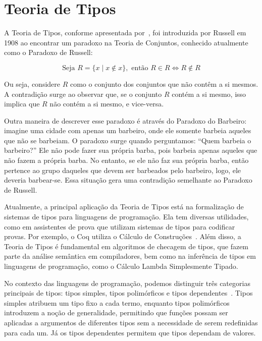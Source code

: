 \section{Teoria de Tipos}\label{sec:type-theory}

A Teoria de Tipos, conforme apresentada por~\cite{COQUAND2022}, foi introduzida por Russell em 1908 ao encontrar um paradoxo na Teoria de Conjuntos, conhecido atualmente como o Paradoxo de Russell:

\begin{equation}\label{eq:russell-paradox}
  \text{Seja } R = \{ x \mid x \notin x \}, \text{ então } R \in R \iff R \notin R
\end{equation}

Ou seja, considere $R$ como o conjunto dos conjuntos que não contêm a si mesmos.
A contradição surge ao observar que, se o conjunto $R$ contém a si mesmo, isso implica que $R$ não contém a si mesmo, e vice-versa.

Outra maneira de descrever esse paradoxo é através do Paradoxo do Barbeiro: imagine uma cidade com apenas um barbeiro, onde ele somente barbeia aqueles que não se barbeiam.
O paradoxo surge quando perguntamos: ``Quem barbeia o barbeiro?''
Ele não pode fazer sua própria barba, pois barbeia apenas aqueles que não fazem a própria barba.
No entanto, se ele não faz sua própria barba, então pertence ao grupo daqueles que devem ser barbeados pelo barbeiro, logo, ele deveria barbear-se.
Essa situação gera uma contradição semelhante ao Paradoxo de Russell.

Atualmente, a principal aplicação da Teoria de Tipos está na formalização de sistemas de tipos para linguagens de programação.
Ela tem diversas utilidades, como em assistentes de prova que utilizam sistemas de tipos para codificar provas.
Por exemplo, o Coq utiliza o Cálculo de Construções~\cite{COQUAND1998}.
Além disso, a Teoria de Tipos é fundamental em algoritmos de checagem de tipos, que fazem parte da análise semântica em compiladores, bem como na inferência de tipos em linguagens de programação, como o Cálculo Lambda Simplesmente Tipado.

No contexto das linguagens de programação, podemos distinguir três categorias principais de tipos: tipos simples, tipos polimórficos e tipos dependentes~\cite{PIERCE2002}.
Tipos simples atribuem um tipo fixo a cada termo, enquanto tipos polimórficos introduzem a noção de generalidade, permitindo que funções possam ser aplicadas a argumentos de diferentes tipos sem a necessidade de serem redefinidas para cada um.
Já os tipos dependentes permitem que tipos dependam de valores.

